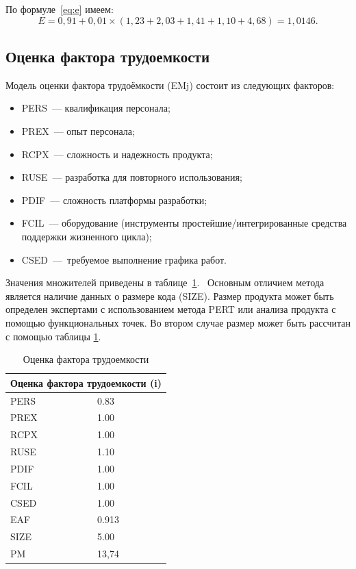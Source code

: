 По формуле~\ref{eq:e} имеем:
\begin{equation}\label{eq:eaf}
	E = 0{,}91+0{,}01 \times (1{,}23 + 2{,}03 + 1{,}41 + 1{,}10 + 4{,}68) = 1{,}0146.
\end{equation}

\subsection{Оценка фактора трудоемкости}

Модель оценки фактора трудоёмкости (EMj) состоит из следующих факторов:
\begin{itemize}
	\item PERS~--- квалификация персонала;
	\item PREX~--- опыт персонала;
	\item RCPX~--- сложность и надежность продукта;
	\item RUSE~--- разработка для повторного использования;
	\item PDIF~--- сложность платформы разработки;
	\item FCIL~--- оборудование (инструменты простейшие/интегрированные средства поддержки жизненного цикла);
	\item CSED~--- требуемое выполнение графика работ.
\end{itemize}

Значения множителей приведены в таблице~\ref{tab:labor_costs_factor}.  Основным отличием метода является наличие данных о размере кода (SIZE). Размер продукта может быть определен экспертами с использованием метода PERT или анализа продукта с помощью функциональных точек. Во втором случае размер может быть рассчитан с помощью таблицы \ref{tab:labor_costs_factor}.

\begin{table}[htb]
	\caption{Оценка фактора трудоемкости}
	\centering
	
	\emergencystretch=10pt
	\begin{tabular}{@{}ll@{}}
		\toprule
		\multicolumn{2}{c}{\textbf{Оценка фактора трудоемкости (i)}} \\
		\midrule
		PERS & 0.83 \\
		PREX & 1.00 \\
		RCPX & 1.00 \\
		RUSE & 1.10 \\
		PDIF & 1.00 \\
		FCIL & 1.00 \\
		CSED & 1.00 \\
		EAF  & 0.913 \\
		SIZE & 5.00 \\
		PM   & 13,74 \\
		\bottomrule
	\end{tabular}
	\label{tab:labor_costs_factor}
\end{table}

